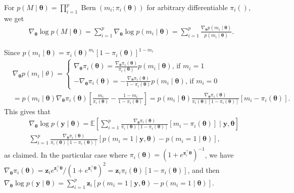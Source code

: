 \documentclass[
  12pt]{article}
\newcommand{\E}{\mathbb{E}}
\newcommand{\by}{\mathbf{y}}
\newcommand{\bz}{\boldsymbol{z}}
\newcommand{\btheta}{\boldsymbol{\theta}}
\begin{document}
For $p(M \mid \btheta)=\prod_{i=1}^p \operatorname{Bern}\left(m_i ; \pi_i(\btheta)\right)$ for arbitrary differentiable $\pi_i()$, we get
\begin{align}
 \nabla_{\btheta} \log p(M \mid \btheta)=
\sum_{i=1}^p \nabla_{\btheta} \log p(m_i \mid \btheta)=
\sum_{i=1}^p \frac{\nabla_{\btheta} p(m_i \mid \btheta)}{p(m_i \mid \btheta)}.
\nonumber
\end{align}

Since $p(m_i \mid \btheta)= \pi_i(\btheta)^{m_i} [1 - \pi_i(\btheta)]^{1- m_i}$
\begin{align}
& \nabla_{\btheta} p(m_i \mid \theta)= \begin{cases}
\nabla_{\btheta} \pi_i(\btheta)= 
\frac{\nabla_{\btheta} \pi_i(\btheta)}{\pi_i(\btheta)} p(m_i \mid \btheta)
\mbox{, if } m_i=1
\\
- \nabla_{\btheta} \pi_i(\btheta)=
- \frac{\nabla_{\btheta} \pi_i(\btheta)}{1 - \pi_i(\btheta)} p(m_i \mid \btheta)
\mbox{, if } m_i=0
\end{cases}
\nonumber \\
&= p(m_i \mid \btheta) \nabla_{\btheta} \pi_i(\btheta) \left[ \frac{m_i}{\pi_i(\btheta)} - \frac{1 - m_i}{1 - \pi_i(\btheta)} \right]
= p(m_i \mid \btheta) \frac{\nabla_{\btheta} \pi_i(\btheta)}{\pi_i(\btheta) [1 - \pi_i(\btheta)]} \left[ m_i - \pi_i(\btheta) \right].
\label{eq:grad_priorprob_indep}
\end{align}
This gives that
\begin{align}
&\nabla_{\btheta}\log p(\by \mid \btheta)= 
\E \left[  \sum_{i=1}^p 
\frac{\nabla_{\btheta} \pi_i(\btheta)}{\pi_i(\btheta) [1 - \pi_i(\btheta)]} \left[ m_i - \pi_i(\btheta) \right]
\mid \by, \btheta \right]
\nonumber \\
& \sum_{i=1}^p \frac{\nabla_{\btheta} \pi_i(\btheta)}{\pi_i(\btheta) [1 - \pi_i(\btheta)]} 
\left[ p(m_i=1 \mid \by, \btheta) - p(m_i=1 \mid \btheta) \right],
\nonumber
\end{align}
as claimed.
In the particular case where $\pi_i(\btheta)= (1 + e^{\bz_i^{\top} \btheta})^{-1}$, we have
$\nabla_{\btheta} \pi_i(\btheta)= \bz_i  e^{\bz_i^{\top} \btheta} / (1 + e^{\bz_i^{\top} \btheta})^2= \bz_i \pi_i(\btheta) [1 - \pi_i(\btheta)]$,
and then \\
$\nabla_{\btheta}\log p(\by \mid \btheta)= \sum_{i=1}^p \bz_i \left[ p(m_i=1 \mid \by, \btheta) - p(m_i=1 \mid \btheta) \right]$.
\end{document}
